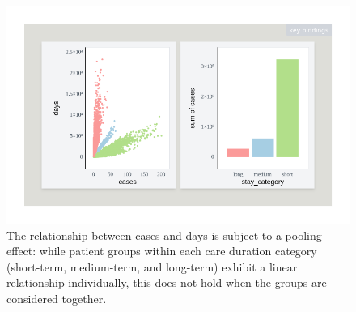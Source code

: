 \documentclass[
]{book}
\newenvironment{Shaded}{\begin{snugshade}}{\end{snugshade}}
\newcommand{\CommentTok}[1]{\textcolor[rgb]{0.56,0.35,0.01}{\textit{#1}}}
\newcommand{\DecValTok}[1]{\textcolor[rgb]{0.00,0.00,0.81}{#1}}
\newcommand{\FunctionTok}[1]{\textcolor[rgb]{0.13,0.29,0.53}{\textbf{#1}}}
\newcommand{\NormalTok}[1]{#1}
\newcommand{\SpecialCharTok}[1]{\textcolor[rgb]{0.81,0.36,0.00}{\textbf{#1}}}
\newcommand{\StringTok}[1]{\textcolor[rgb]{0.31,0.60,0.02}{#1}}
\theoremstyle{definition}
\theoremstyle{definition}
\theoremstyle{definition}
\theoremstyle{definition}
\theoremstyle{remark}
\begin{document}
\begin{Shaded}
\end{Shaded}

\begin{figure}

{\centering \includegraphics[width=1\linewidth,height=1\textheight]{./figures/example-cases-stay-cat} 

}

\caption{The relationship between cases and days is subject to a pooling effect: while patient groups within each care duration category (short-term, medium-term, and long-term) exhibit a linear relationship individually, this does not hold when the groups are considered together.}\label{fig:example-cases-stay-cat}
\end{figure}
\end{document}
